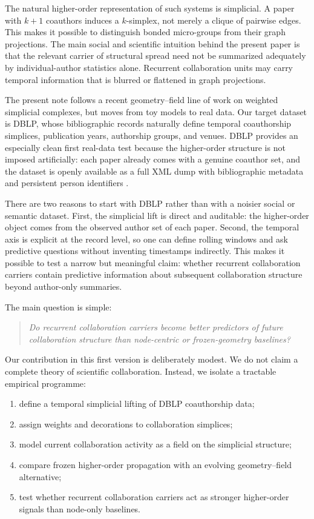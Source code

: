 \documentclass[11pt]{article}
\begin{document}
The natural higher-order representation of such systems is simplicial. A paper with $k+1$ coauthors induces a $k$-simplex, not merely a clique of pairwise edges. This makes it possible to distinguish bonded micro-groups from their graph projections. The main social and scientific intuition behind the present paper is that the relevant carrier of structural spread need not be summarized adequately by individual-author statistics alone. Recurrent collaboration units may carry temporal information that is blurred or flattened in graph projections.

The present note follows a recent geometry--field line of work on weighted simplicial complexes, but moves from toy models to real data. Our target dataset is DBLP, whose bibliographic records naturally define temporal coauthorship simplices, publication years, authorship groups, and venues. DBLP provides an especially clean first real-data test because the higher-order structure is not imposed artificially: each paper already comes with a genuine coauthor set, and the dataset is openly available as a full XML dump with bibliographic metadata and persistent person identifiers \cite{DBLPXML,DBLPFAQ}.

There are two reasons to start with DBLP rather than with a noisier social or semantic dataset. First, the simplicial lift is direct and auditable: the higher-order object comes from the observed author set of each paper. Second, the temporal axis is explicit at the record level, so one can define rolling windows and ask predictive questions without inventing timestamps indirectly. This makes it possible to test a narrow but meaningful claim: whether recurrent collaboration carriers contain predictive information about subsequent collaboration structure beyond author-only summaries.

The main question is simple:
\begin{quote}
\emph{Do recurrent collaboration carriers become better predictors of future collaboration structure than node-centric or frozen-geometry baselines?}
\end{quote}

Our contribution in this first version is deliberately modest. We do not claim a complete theory of scientific collaboration. Instead, we isolate a tractable empirical programme:
\begin{enumerate}[label=(\roman*)]
    \item define a temporal simplicial lifting of DBLP coauthorship data;
    \item assign weights and decorations to collaboration simplices;
    \item model current collaboration activity as a field on the simplicial structure;
    \item compare frozen higher-order propagation with an evolving geometry--field alternative;
    \item test whether recurrent collaboration carriers act as stronger higher-order signals than node-only baselines.
\end{enumerate}
\end{document}
